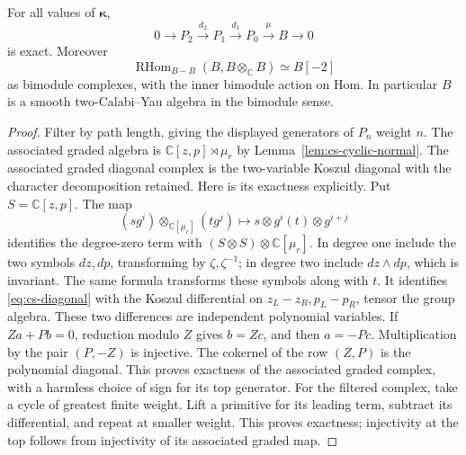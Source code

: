 \begin{proposition}\label{prop:cs-self-dual}
For all values of \(\boldsymbol\kappa\),
\[
 0\longrightarrow P_2\xrightarrow{d_2}P_1
 \xrightarrow{d_1}P_0\xrightarrow{\mu}B\longrightarrow0
\]
is exact. Moreover
\[
 \operatorname{RHom}_{B-B}(B,B\otimes_{\mathbb C}B)\simeq B[-2]
\]
as bimodule complexes, with the inner bimodule action on Hom.
In particular \(B\) is a smooth two-Calabi--Yau algebra in the
bimodule sense.
\end{proposition}
\begin{proof}
Filter by path length, giving the displayed generators of \(P_n\)
weight \(n\). The associated graded algebra is
\(\mathbb C[z,p]\rtimes\mu_r\) by
Lemma~\ref{lem:cs-cyclic-normal}. The associated graded diagonal
complex is the two-variable Koszul diagonal with the character
decomposition retained.
Here is its exactness explicitly. Put \(S=\mathbb C[z,p]\).
The map
\[
 (s g^i)\otimes_{\mathbb C[\mu_r]}(t g^j)
 \longmapsto s\otimes g^i(t)\otimes g^{i+j}
\]
identifies the degree-zero term with
\((S\otimes S)\otimes\mathbb C[\mu_r]\).
In degree one include the two symbols \(dz,dp\), transforming
by \(\zeta,\zeta^{-1}\); in degree two include
\(dz\wedge dp\), which is invariant.
The same formula transforms these symbols along with \(t\).
It identifies \eqref{eq:cs-diagonal} with the Koszul differential
on \(z_L-z_R,p_L-p_R\), tensor the group algebra.
These two differences are independent polynomial variables.
If \(Za+Pb=0\), reduction modulo \(Z\) gives \(b=Zc\),
and then \(a=-Pc\). Multiplication by the pair \((P,-Z)\)
is injective. The cokernel of the row \((Z,P)\) is the
polynomial diagonal. This proves exactness of the associated
graded complex, with a harmless choice of sign for its top generator.
For the filtered complex, take a cycle of greatest finite weight.
Lift a primitive for its leading term, subtract its differential,
and repeat at smaller weight. This proves exactness; injectivity
at the top follows from injectivity of its associated graded map.


\end{proof}

